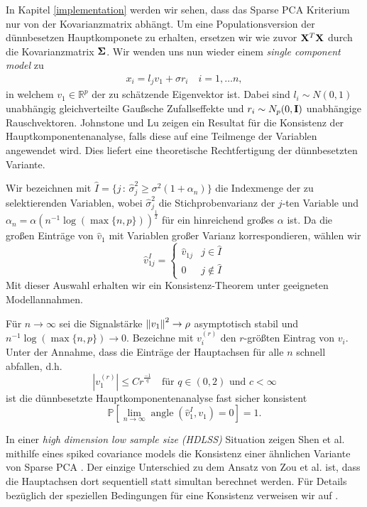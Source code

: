 In Kapitel \ref{implementation} werden wir sehen, dass das Sparse PCA Kriterium nur von der Kovarianzmatrix abhängt. Um eine Populationsversion der dünnbesetzen Hauptkomponete zu erhalten, ersetzen wir wie zuvor $\mathbf{X}^T \mathbf{X}$ durch die Kovarianzmatrix $\mathbf{\Sigma}$. Wir wenden uns nun wieder einem \textit{single component model} zu
\begin{align}
\label{single_component_model_spca}
x_i = l_j v_1 + \sigma r_i \quad i = 1, \ldots n,
\end{align}
in welchem $v_1 \in \mathbb{R}^p$ der zu schätzende Eigenvektor ist. Dabei sind $l_i \sim N(0,1)$ unabhängig gleichverteilte Gaußsche Zufallseffekte und $r_i \sim N_p(0, \mathbf{I})$ unabhängige Rauschvektoren. Johnstone und Lu \cite{johnstone} zeigen ein Resultat für die Konsistenz der Hauptkomponentenanalyse, falls diese auf eine Teilmenge der Variablen angewendet wird. Dies liefert eine theoretische Rechtfertigung der dünnbesetzten Variante.

Wir bezeichnen mit $\widehat{I} = \{j \, \colon \, \widehat{\sigma}_j^2 \geq \sigma^2 (1 + \alpha_n)\}$ die Indexmenge der zu selektierenden Variablen, wobei $\widehat{\sigma}_j^2$ die Stichprobenvarianz der $j$-ten Variable und $\alpha_n = \alpha (n^{-1}\log(\max \{n,p\}))^{\frac{1}{2}}$ für ein hinreichend großes $\alpha$ ist. Da die großen Einträge von $\widehat{v}_1$ mit Variablen großer Varianz korrespondieren, wählen wir 
$$\widehat{v}_{1j}^I = \begin{cases} 
      \widehat{v}_{1j} & j \in \widehat{I}\\
      0 & j \not\in \widehat{I}
   \end{cases}$$
Mit dieser Auswahl erhalten wir ein Konsistenz-Theorem unter geeigneten Modellannahmen.

\begin{thm}
Für $n \to \infty$ sei die Signalstärke $\left\lVert v_1 \right\rVert^2 \to \rho$ asymptotisch stabil und $n^{-1}\log(\max \{n,p\}) \to 0$. Bezeichne mit $v_i^{(r)}$ den $r$-größten Eintrag von $v_i$. Unter der Annahme, dass die Einträge der Hauptachsen für alle $n$ schnell abfallen, d.h.
$$|v_1^{(r)}| \leq Cr^{\frac{-1}{q}} \quad \text{für } q \in (0,2) \text{ und } c < \infty$$
ist die dünnbesetzte Hauptkomponentenanalyse fast sicher konsistent
$$\mathbb{P}\left[\lim_{n \to \infty} \operatorname{angle}(\widehat{v}_1^I, v_1) = 0\right] = 1.$$ 
\end{thm}

In einer \textit{high dimension low sample size (HDLSS)} Situation zeigen Shen et al. mithilfe eines spiked covariance models die Konsistenz einer ähnlichen Variante von Sparse PCA \cite{shen}. Der einzige Unterschied zu dem Ansatz von Zou et al. ist, dass die Hauptachsen dort sequentiell statt simultan berechnet werden. Für Details bezüglich der speziellen Bedingungen für eine Konsistenz verweisen wir auf \cite{shen_consistency}.